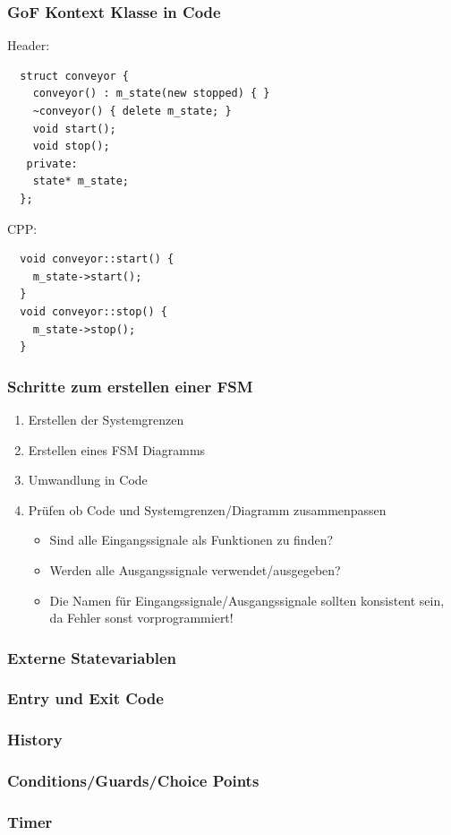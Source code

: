 \documentclass{beamer}
\begin{document}
\begin{frame}[fragile]
 \frametitle{GoF Kontext Klasse in Code}
 Header:
 \begin{lstlisting}
  struct conveyor {
    conveyor() : m_state(new stopped) { }
    ~conveyor() { delete m_state; }
    void start();
    void stop();
   private:
    state* m_state;
  };
 \end{lstlisting}
 CPP:
 \begin{lstlisting}
  void conveyor::start() {
    m_state->start();
  }
  void conveyor::stop() {
    m_state->stop();
  }
 \end{lstlisting}
\end{frame}

\begin{frame}
 \frametitle{Schritte zum erstellen einer FSM}
 \begin{enumerate}
  \item Erstellen der Systemgrenzen
  \item Erstellen eines FSM Diagramms
  \item Umwandlung in Code
  \item Pr\"ufen ob Code und Systemgrenzen/Diagramm zusammenpassen
  \begin{itemize}
   \item Sind alle Eingangssignale als Funktionen zu finden?
   \item Werden alle Ausgangssignale verwendet/ausgegeben?
   \item Die Namen f\"ur Eingangssignale/Ausgangssignale sollten konsistent sein, da Fehler sonst vorprogrammiert!
  \end{itemize}
 \end{enumerate}
\end{frame}

\begin{frame}
 \frametitle{Externe Statevariablen}
\end{frame}

\begin{frame}
 \frametitle{Entry und Exit Code}
\end{frame}

\begin{frame}
 \frametitle{History}
\end{frame}

\begin{frame}
 \frametitle{Conditions/Guards/Choice Points}
\end{frame}

\begin{frame}
 \frametitle{Timer}
\end{frame}
\end{document}
